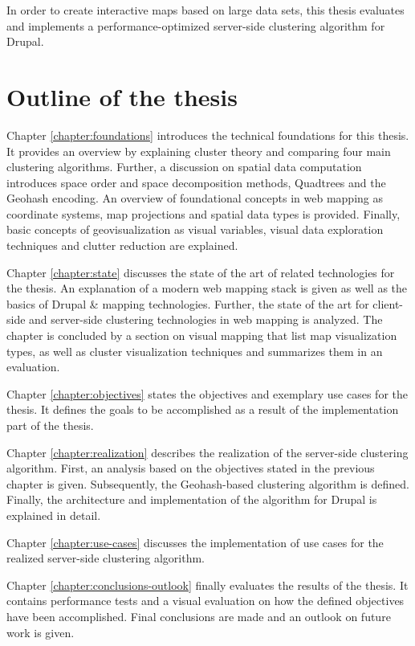In order to create interactive maps based on large data sets, this thesis evaluates and implements a performance-optimized server-side clustering algorithm for Drupal.


\section{Outline of the thesis}

Chapter \ref{chapter:foundations} introduces the technical foundations for this thesis. It provides an overview by explaining cluster theory and comparing four main clustering algorithms. Further, a discussion on spatial data computation introduces space order and space decomposition methods, Quadtrees and the Geohash encoding. An overview of foundational concepts in web mapping as coordinate systems, map projections and spatial data types is provided. Finally, basic concepts of geovisualization as visual variables, visual data exploration techniques and clutter reduction are explained. 

Chapter \ref{chapter:state} discusses the state of the art of related technologies for the thesis. An explanation of a modern web mapping stack is given as well as the basics of Drupal \& mapping technologies. Further, the state of the art for client-side and server-side clustering technologies in web mapping is analyzed. The chapter is concluded by a section on visual mapping that list map visualization types, as well as cluster visualization techniques and summarizes them in an evaluation. 

Chapter \ref{chapter:objectives} states the objectives and exemplary use cases for the thesis. It defines the goals to be accomplished as a result of the implementation part of the thesis.

Chapter \ref{chapter:realization} describes the realization of the server-side clustering algorithm. First, an analysis based on the objectives stated in the previous chapter is given. Subsequently, the Geohash-based clustering algorithm is defined. Finally, the architecture and implementation of the algorithm for Drupal is explained in detail.

Chapter \ref{chapter:use-cases} discusses the implementation of use cases for the realized server-side clustering algorithm.

Chapter \ref{chapter:conclusions-outlook} finally evaluates the results of the thesis. It contains performance tests and a visual evaluation on how the defined objectives have been accomplished. Final conclusions are made and an outlook on future work is given.




